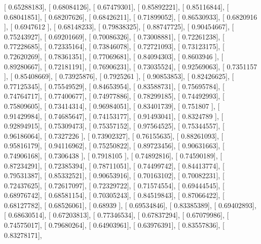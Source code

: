 \documentclass{article}
\begin{document}
       [ 0.65288183],
       [ 0.68084126],
       [ 0.67479301],
       [ 0.85892221],
       [ 0.85116844],
       [ 0.68041851],
       [ 0.68207626],
       [ 0.68426211],
       [ 0.71899052],
       [ 0.86530933],
       [ 0.6820916 ],
       [ 0.6947612 ],
       [ 0.68148233],
       [ 0.79838325],
       [ 0.88747725],
       [ 0.90454667],
       [ 0.75243927],
       [ 0.69201669],
       [ 0.70086326],
       [ 0.73008881],
       [ 0.72261238],
       [ 0.77228685],
       [ 0.72335164],
       [ 0.73846078],
       [ 0.72721093],
       [ 0.73123175],
       [ 0.72620269],
       [ 0.78361351],
       [ 0.77069681],
       [ 0.84094303],
       [ 0.8603946 ],
       [ 0.89280667],
       [ 0.72181191],
       [ 0.76906231],
       [ 0.73035524],
       [ 0.92569063],
       [ 0.7351157 ],
       [ 0.85408669],
       [ 0.73925876],
       [ 0.7925261 ],
       [ 0.90853853],
       [ 0.82426625],
       [ 0.77125345],
       [ 0.75549529],
       [ 0.84653954],
       [ 0.83588731],
       [ 0.75695784],
       [ 0.74764717],
       [ 0.77400677],
       [ 0.74977886],
       [ 0.78299185],
       [ 0.74492993],
       [ 0.75809605],
       [ 0.73414314],
       [ 0.96984051],
       [ 0.83401739],
       [ 0.751807  ],
       [ 0.91429984],
       [ 0.74685647],
       [ 0.74153177],
       [ 0.91493041],
       [ 0.8324789 ],
       [ 0.92894915],
       [ 0.75309473],
       [ 0.75357152],
       [ 0.97564525],
       [ 0.75344557],
       [ 0.96186064],
       [ 0.7327226 ],
       [ 0.73902327],
       [ 0.76155635],
       [ 0.88261093],
       [ 0.95816179],
       [ 0.94116962],
       [ 0.75250822],
       [ 0.89723456],
       [ 0.90631663],
       [ 0.74906168],
       [ 0.7306438 ],
       [ 0.7918105 ],
       [ 0.74892816],
       [ 0.74590189],
       [ 0.87234291],
       [ 0.72385394],
       [ 0.78711051],
       [ 0.74499742],
       [ 0.84413774],
       [ 0.79531387],
       [ 0.85332521],
       [ 0.90653916],
       [ 0.70163102],
       [ 0.70082231],
       [ 0.72437625],
       [ 0.72617097],
       [ 0.72329722],
       [ 0.71574554],
       [ 0.69444545],
       [ 0.68976742],
       [ 0.68581154],
       [ 0.70305243],
       [ 0.84519843],
       [ 0.87066422],
       [ 0.68127782],
       [ 0.68526061],
       [ 0.68939   ],
       [ 0.69534846],
       [ 0.83385389],
       [ 0.69402893],
       [ 0.68630514],
       [ 0.67203813],
       [ 0.77346534],
       [ 0.67837294],
       [ 0.67079986],
       [ 0.74575017],
       [ 0.79680264],
       [ 0.64903961],
       [ 0.63976391],
       [ 0.83557836],
       [ 0.83278171],
\end{document}
